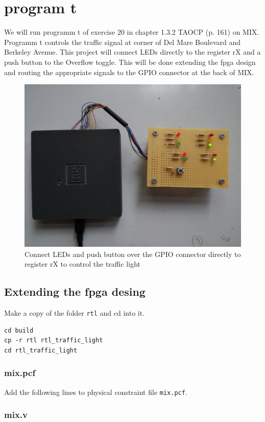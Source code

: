 \documentclass[a4paper,ngerman]{scrartcl}
\begin{document}
\section{program t}
We will run programm t of exercise 20 in chapter 1.3.2 TAOCP (p. 161) on MIX. Programm t controls the traffic signal at corner of Del Mare Boulevard and Berkeley Avenue. This project will connect LEDs directly to the register rX and a push button to the  Overflow toggle. This will be done extending the fpga design and routing the appropriate signals to the GPIO connector at the back of MIX.
\begin{figure}
	\centering
	\includegraphics[width=0.7\linewidth]{../MIX_traffic}
	\caption{Connect LEDs and push button over the GPIO connector directly to register rX to control the traffic light}
	\label{fig:mixtraffic}
\end{figure}


\subsection{Extending the fpga desing}

Make a copy of the folder \lstinline|rtl| and cd into it.

\begin{lstlisting}
cd build
cp -r rtl rtl_traffic_light
cd rtl_traffic_light
\end{lstlisting}


\subsubsection{mix.pcf}

Add the following lines to physical constraint file \lstinline|mix.pcf|.



\subsubsection{mix.v}
\end{document}
